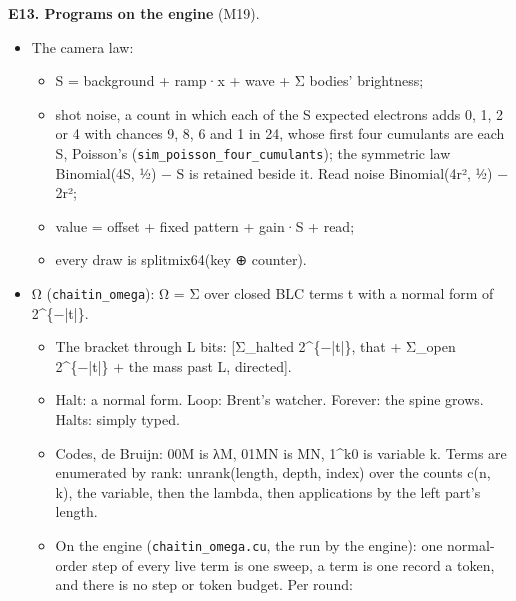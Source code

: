 \textbf{E13. Programs on the engine} (M19).

\begin{itemize}
\item The camera law:

\begin{itemize}
\item S = background + ramp·x + wave + Σ bodies' brightness;
\item shot noise, a count in which each of the S expected electrons adds 0, 1, 2 or 4 with chances 9, 8, 6 and 1 in 24, whose first four cumulants are each S, Poisson's (\texttt{sim\_\allowbreak{}poisson\_\allowbreak{}four\_\allowbreak{}cumulants}); the symmetric law Binomial(4S, ½) − S is retained beside it. Read noise Binomial(4r², ½) − 2r²;
\item value = offset + fixed pattern + gain·S + read;
\item every draw is splitmix64(key ⊕ counter).
\end{itemize}
\item Ω (\texttt{chaitin\_\allowbreak{}omega}): Ω = Σ over closed BLC terms t with a normal form of 2\textasciicircum{}\{−|t|\}.

\begin{itemize}
\item The bracket through L bits: [Σ\_\allowbreak{}halted 2\textasciicircum{}\{−|t|\}, that + Σ\_\allowbreak{}open 2\textasciicircum{}\{−|t|\} + the mass past L, directed].
\item Halt: a normal form. Loop: Brent's watcher. Forever: the spine grows. Halts: simply typed.
\item Codes, de Bruijn: 00M is λM, 01MN is MN, 1\textasciicircum{}k0 is variable k. Terms are enumerated by rank: unrank(length, depth, index) over the counts c(n, k), the variable, then the lambda, then applications by the left part's length.
\item On the engine (\texttt{chaitin\_\allowbreak{}omega.\allowbreak{}cu}, the run by the engine): one normal-order step of every live term is one sweep, a term is one record a token, and there is no step or token budget. Per round:


\end{itemize}
\end{itemize}
